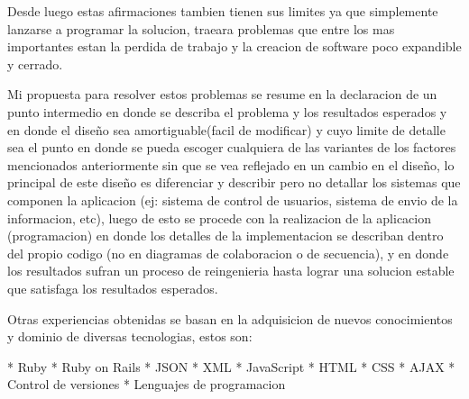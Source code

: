 Desde luego estas afirmaciones tambien tienen sus limites ya que simplemente lanzarse a programar la solucion, traeara problemas que entre los mas importantes estan la perdida de trabajo y la creacion de software poco expandible y cerrado.

Mi propuesta para resolver estos problemas se resume en la declaracion de un punto intermedio en donde se describa el problema y los resultados esperados y en donde el diseño sea amortiguable(facil de modificar) y cuyo limite de detalle sea el punto en donde se pueda escoger cualquiera de las variantes de los factores mencionados anteriormente sin que se vea reflejado en un cambio en el diseño, lo principal de este diseño es diferenciar y describir pero no detallar los sistemas que componen la aplicacion (ej: sistema de control de usuarios, sistema de envio de la informacion, etc), luego de esto se procede con la realizacion de la aplicacion (programacion) en donde los detalles de la implementacion se describan dentro del propio codigo (no en diagramas de colaboracion o de secuencia), y en donde los resultados sufran un proceso de reingenieria hasta lograr una solucion estable que satisfaga los resultados esperados.

Otras experiencias obtenidas se basan en la adquisicion de nuevos conocimientos y dominio de diversas tecnologias, estos son:

* Ruby
* Ruby on Rails
* JSON
* XML
* JavaScript
* HTML
* CSS
* AJAX
* Control de versiones
* Lenguajes de programacion
